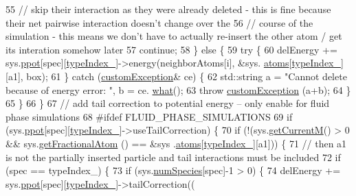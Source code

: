 \begin{DoxyCode}
55                     \textcolor{comment}{// skip their interaction as they were already deleted - this is fine because their net
       pairwise interaction doesn't change over the}
56                     \textcolor{comment}{// course of the simulation - this means we don't have to actually re-insert the other
       atom / get its interation somehow later}
57                     \textcolor{keywordflow}{continue};
58                 \} \textcolor{keywordflow}{else} \{
59                 \textcolor{keywordflow}{try} \{
60                     delEnergy += sys.\hyperlink{classsim_system_ad2e290b5963f132e6a3a56cee35c8e9f}{ppot}[spec][\hyperlink{classmc_move_acb731965547b0326ef318ec96da8b46a}{typeIndex\_}]->energy(neighborAtoms[i], &sys.
      \hyperlink{classsim_system_a90421b19082f7fb8fc23b7264b1161e4}{atoms}[\hyperlink{classmc_move_acb731965547b0326ef318ec96da8b46a}{typeIndex\_}][a1], box);
61                 \} \textcolor{keywordflow}{catch} (\hyperlink{classcustom_exception}{customException}& ce) \{
62                     std::string a = \textcolor{stringliteral}{"Cannot delete because of energy error: "}, b = ce.
      \hyperlink{classcustom_exception_aeb6ab5848b038adfc68fde86a512f691}{what}();
63                     \textcolor{keywordflow}{throw} \hyperlink{classcustom_exception}{customException} (a+b);
64                 \}
65                 \}
66             \}
67             \textcolor{comment}{// add tail correction to potential energy -- only enable for fluid phase simulations}
68 \textcolor{preprocessor}{#ifdef FLUID\_PHASE\_SIMULATIONS}
69 \textcolor{preprocessor}{}            \textcolor{keywordflow}{if} (sys.\hyperlink{classsim_system_ad2e290b5963f132e6a3a56cee35c8e9f}{ppot}[spec][\hyperlink{classmc_move_acb731965547b0326ef318ec96da8b46a}{typeIndex\_}]->useTailCorrection) \{
70                 \textcolor{keywordflow}{if} (!(sys.\hyperlink{classsim_system_a299fe4372e610b554eaaf5f5957b2dbc}{getCurrentM}() > 0 && sys.\hyperlink{classsim_system_a2ab77377c60e0e3109a6e875690b0ab7}{getFractionalAtom} () == &sys
      .\hyperlink{classsim_system_a90421b19082f7fb8fc23b7264b1161e4}{atoms}[\hyperlink{classmc_move_acb731965547b0326ef318ec96da8b46a}{typeIndex\_}][a1])) \{
71                     \textcolor{comment}{// then a1 is not the partially inserted particle and tail interactions must be
       included}
72                     \textcolor{keywordflow}{if} (spec == typeIndex\_) \{
73                                 \textcolor{keywordflow}{if} (sys.\hyperlink{classsim_system_a9eea865e6dc1cff377b1e79c4d9c23f0}{numSpecies}[spec]-1 > 0) \{
74                                     delEnergy += sys.\hyperlink{classsim_system_ad2e290b5963f132e6a3a56cee35c8e9f}{ppot}[spec][\hyperlink{classmc_move_acb731965547b0326ef318ec96da8b46a}{typeIndex\_}]->tailCorrection((

\end{DoxyCode}
